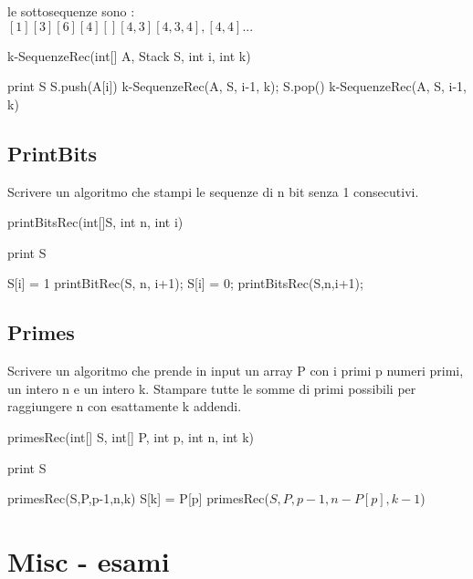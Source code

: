 \documentclass[oneside]{book}
\begin{document}
le sottosequenze sono :\\
$[1][3][6][4][][4,3][4,3,4],[4,4] ...$

\begin{algorithm}
\caption{k-SequenzeRec(int[] A, Stack S, int i, int k)\label{alg:cap}}
\begin{algorithmic}

	\State print S
\Else
		\State S.push(A[i])
		\State k-SequenzeRec(A, S, i-1, k);
		\State S.pop()
	\EndIf
	\State k-SequenzeRec(A, S, i-1, k)

\EndIf
\end{algorithmic}
\end{algorithm}


\section{PrintBits}
Scrivere un algoritmo che stampi le sequenze di n bit senza 1 consecutivi.

\begin{algorithm}
\caption{printBitsRec(int[]S, int n, int i)\label{alg:cap}}
\begin{algorithmic}
	\State print S
\EndIf

	\State S[i] = 1
	\State printBitRec(S, n, i+1);
\Else
	\State S[i] = 0;
	\State printBitsRec(S,n,i+1);
\EndIf
\end{algorithmic}
\end{algorithm}
\newpage
\section{Primes}
Scrivere un algoritmo che prende in input un array P con i primi p numeri primi, un intero n e un intero k. Stampare tutte le somme di primi possibili per raggiungere n con esattamente k addendi. 

\begin{algorithm}
\caption{primesRec(int[] S, int[] P, int p, int n, int k)\label{alg:cap}}
\begin{algorithmic}
	\State print S
\EndIf

	\State primesRec(S,P,p-1,n,k)
	\State S[k] = P[p]
	\State primesRec($S,P,p-1,n-P[p],k-1$)
\EndIf
\end{algorithmic}
\end{algorithm}
\chapter{Misc - esami}
\end{document}
